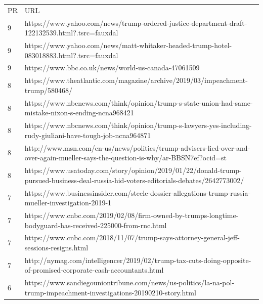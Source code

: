 \documentclass[11pt]{article}
\begin{document}
	\begin{table}[h!]
		\begin{tabular}{ll}
			PR & URL                                                                                                                                   \\
			9  & https://www.yahoo.com/news/trump-ordered-justice-department-draft-122132539.html?.tsrc=fauxdal                                        \\
			9  & https://www.yahoo.com/news/matt-whitaker-headed-trump-hotel-083018883.html?.tsrc=fauxdal                                              \\
			9  & https://www.bbc.co.uk/news/world-us-canada-47061509                                                                                   \\
			8  & https://www.theatlantic.com/magazine/archive/2019/03/impeachment-trump/580468/                                                        \\
			8  & https://www.nbcnews.com/think/opinion/trump-s-state-union-had-same-mistake-nixon-s-ending-ncna968421                                  \\
			8  & https://www.nbcnews.com/think/opinion/trump-s-lawyers-yes-including-rudy-giuliani-have-tough-job-ncna964871                           \\
			8  & http://www.msn.com/en-us/news/politics/trump-advisers-lied-over-and-over-again-mueller-says-the-question-is-why/ar-BBSN7ef?ocid=st    \\
			8  & https://www.usatoday.com/story/opinion/2019/01/22/donald-trump-pursued-business-deal-russia-hid-voters-editorials-debates/2642773002/ \\
			7  & https://www.businessinsider.com/steele-dossier-allegations-trump-russia-mueller-investigation-2019-1                                  \\
			7  & https://www.cnbc.com/2019/02/08/firm-owned-by-trumps-longtime-bodyguard-has-received-225000-from-rnc.html                             \\
			7  & https://www.cnbc.com/2018/11/07/trump-says-attorney-general-jeff-sessions-resigns.html                                                \\
			7  & http://nymag.com/intelligencer/2019/02/trump-tax-cuts-doing-opposite-of-promised-corporate-cash-accountants.html                      \\
			6  & https://www.sandiegouniontribune.com/news/us-politics/la-na-pol-trump-impeachment-investigations-20190210-story.html                  \\

\end{tabular}
\end{table}
\end{document}
